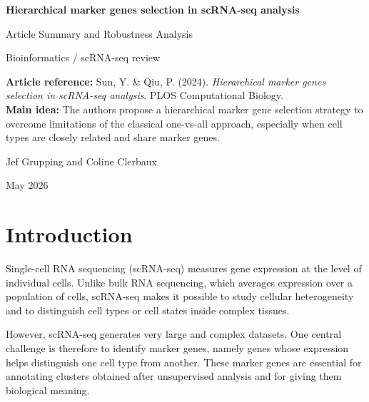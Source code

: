 \documentclass[11pt,a4paper]{article}
\begin{document}
\begin{titlepage}
    \centering
    \vspace*{2cm}
    {\Huge\bfseries\color{titleblue} Hierarchical marker genes selection in scRNA-seq analysis\par}
    \vspace{0.4cm}
    {\LARGE Article Summary and Robustness Analysis\par}
    \vspace{1cm}
    {\large Bioinformatics / scRNA-seq review\par}
    \vspace{1.5cm}

    \begin{minipage}{0.9\textwidth}
    \centering
    \setlength{\fboxsep}{12pt}
    \colorbox{softgray}{
        \parbox{0.85\textwidth}{
        \textbf{Article reference:} Sun, Y. \& Qiu, P. (2024). \textit{Hierarchical marker genes selection in scRNA-seq analysis}. PLOS Computational Biology.\\[0.2cm]
        \textbf{Main idea:} The authors propose a hierarchical marker gene selection strategy to overcome limitations of the classical one-vs-all approach, especially when cell types are closely related and share marker genes.
        }
    }
    \end{minipage}

    \vfill
    {\large Jef Grupping and Coline Clerbaux \par}
    \vspace{0.4cm}
    {\large May 2026 \par}
    \vfill
\end{titlepage}

\tableofcontents
\newpage

\section{Introduction}

Single-cell RNA sequencing (scRNA-seq) measures gene expression at the level of individual cells. Unlike bulk RNA sequencing, which averages expression over a population of cells, scRNA-seq makes it possible to study cellular heterogeneity and to distinguish cell types or cell states inside complex tissues.

However, scRNA-seq generates very large and complex datasets. One central challenge is therefore to identify marker genes, namely genes whose expression helps distinguish one cell type from another.
These marker genes are essential for annotating clusters obtained after unsupervised analysis and for giving them biological meaning.
\end{document}
